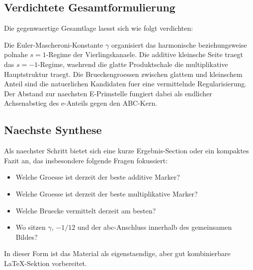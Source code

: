\subsection{Verdichtete Gesamtformulierung}

Die gegenwaertige Gesamtlage laesst sich wie folgt verdichten:

Die Euler-Mascheroni-Konstante $\gamma$ organisiert das harmonische
beziehungsweise polnahe $s=1$-Regime der Vierlingskanaele. Die additive
kleinsche Seite traegt das $s=-1$-Regime, waehrend die glatte
Produktschale die multiplikative Hauptstruktur traegt. Die
Brueckengroessen zwischen glattem und kleinschem Anteil sind die
natuerlichen Kandidaten fuer eine vermittelnde Regularisierung. Der
Abstand zur naechsten E-Primstelle fungiert dabei als endlicher
Achsenabstieg des e-Anteils gegen den ABC-Kern.

\subsection{Naechste Synthese}

Als naechster Schritt bietet sich eine kurze Ergebnis-Section oder ein
kompaktes Fazit an, das insbesondere folgende Fragen fokussiert:
\begin{itemize}
\item Welche Groesse ist derzeit der beste additive Marker?
\item Welche Groesse ist derzeit der beste multiplikative Marker?
\item Welche Bruecke vermittelt derzeit am besten?
\item Wo sitzen $\gamma$, $-1/12$ und der abc-Anschluss innerhalb des
gemeinsamen Bildes?
\end{itemize}

In dieser Form ist das Material als eigenstaendige, aber gut
kombinierbare LaTeX-Sektion vorbereitet.
